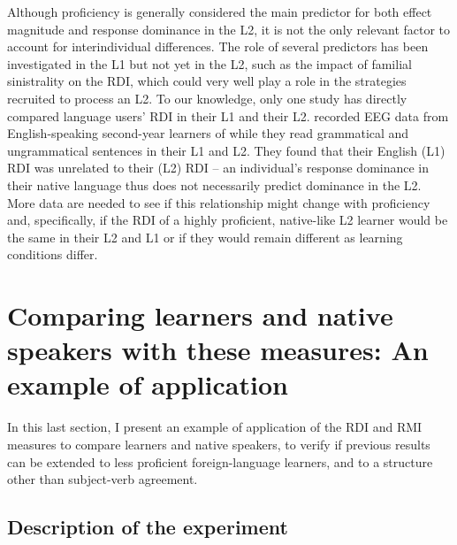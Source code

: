 \documentclass[output=paper,colorlinks,citecolor=brown,modfonts,nonflat]{../langscibook}
\begin{document}
\largerpage
Although proficiency is generally considered the main predictor for both effect magnitude and response dominance in the L2, it is not the only relevant factor to account for interindividual differences. The role of several predictors has been investigated in the L1 but not yet in the L2, such as the impact of familial sinistrality on the RDI, which could very well play a role in the strategies recruited to process an L2. To our knowledge, only one study has directly compared language users’ RDI in their L1 and their L2. \citet{WamplerEtAl2014} recorded EEG data from English-speaking second-year learners of  while they read grammatical and ungrammatical sentences in their L1 and L2. They found that their English (L1) RDI was unrelated to their  (L2) RDI – an individual’s response dominance in their native language thus does not necessarily predict dominance in the L2. More data are needed to see if this relationship might change with proficiency and, specifically, if the RDI of a highly proficient, native-like L2 learner would be the same in their L2 and L1 or if they would remain different as learning conditions differ.   


\section{Comparing learners and native speakers with these measures: An example of application}


In this last section, I present an example of application of the RDI and RMI measures to compare learners and native speakers, to verify if previous results can be extended to less proficient foreign-language learners, and to a structure other than subject-verb agreement.

\subsection{Description of the experiment}
\end{document}
